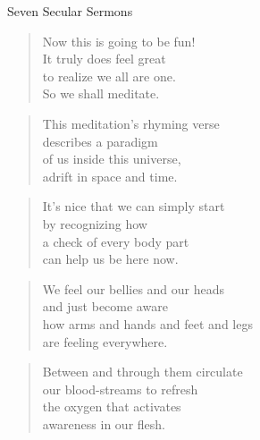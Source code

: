 \documentclass[10pt,a4paper]{article}
\begin{document}
\begin{titlepage}
    \centering
    {\huge Seven Secular Sermons\par} %
%    
\end{titlepage}

\tableofcontents
\pagebreak

\begin{multicols}{2}


\begin{verse}
Now this is going to be fun!\\
It truly does feel great\\
to realize we all are one.\\
So we shall meditate.
\end{verse}

\begin{verse}
This meditation’s rhyming verse\\
describes a paradigm\\
of us inside this universe,\\
adrift in space and time.
\end{verse}

\begin{verse}
It’s nice that we can simply start\\
by recognizing how\\
a check of every body part\\
can help us be here now.
\end{verse}

\begin{verse}
We feel our bellies and our heads\\
and just become aware\\
how arms and hands and feet and legs\\
are feeling everywhere.
\end{verse}

\begin{verse}
Between and through them circulate\\
our blood-streams to refresh\\
the oxygen that activates\\
awareness in our flesh.
\end{verse}


\end{multicols}
\end{document}
